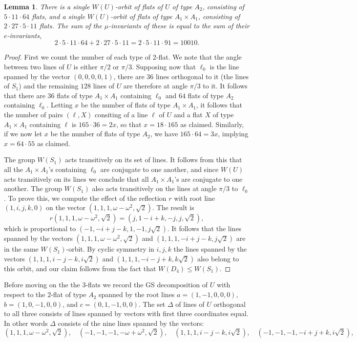 \documentclass[11pt, reqno]{amsart}
\numberwithin{equation}{section}
\theoremstyle{definition}
\theoremstyle{plain}
\newtheorem{lemma}[theorem]{Lemma}
\begin{document}
\begin{lemma}
There is a single $W(U)$-orbit of flats of $U$ of type $A_2$, consisting of $5 \cdot 11 \cdot 64$ flats, and a single $W(U)$-orbit of flats of type $A_1 \times A_1$, consisting of $2 \cdot 27 \cdot 5 \cdot 11$ flats. The sum of the $\mu$-invariants of these is equal to the sum of their $e$-invariants, $$2 \cdot 5 \cdot 11 \cdot 64+2 \cdot 27 \cdot 5 \cdot 11=2 \cdot 5 \cdot 11 \cdot 91=10010.$$
\end{lemma}
\begin{proof}
First we count the number of each type of $2$-flat. We note that the angle between two lines of $U$ is either $\pi /2$ or $\pi /3$. Supposing now that $\ell_0$ is the line spanned by the vector $(0,0,0,0,1)$, there are $36$ lines orthogonal to it (the lines of $S_1$) and the remaining $128$ lines of $U$ are therefore at angle $\pi /3$ to it. It follows that there are $36$ flats of type $A_1 \times A_1$ containing $\ell_0$ and $64$ flats of type $A_2$ containing $\ell_0$. Letting $x$ be the number of flats of type $A_1 \times A_1$, it follows that the number of pairs $(\ell,X)$ consiting of a line $\ell$ of $U$ and a flat $X$ of type $A_1 \times A_1$ containing $\ell$ is $165 \cdot 36 = 2x$, so that $x=18 \cdot 165$ as claimed. Similarly, if we now let $x$ be the number of flats of type $A_2$, we have $165 \cdot 64=3x$, implying $x=64 \cdot 55$ as claimed.

The group $W(S_1)$ acts transitively on its set of lines. It follows from this that all the $A_1 \times A_1$'s containing $\ell_0$ are conjugate to one another, and since $W(U)$ acts transitively on its lines we conclude that all $A_1 \times A_1$'s are conjugate to one another. The group $W(S_1)$ also acts transitively on the lines at angle $\pi/3$ to $\ell_0$. To prove this, we compute the effect of the reflection $r$ with root line $(1,i,j,k,0)$ on the vector $(1,1,1,\omega-\omega^2,\sqrt{2})$. The result is
$$r(1,1,1,\omega-\omega^2,\sqrt{2})=(j,1-i+k,-j,j,\sqrt{2}),$$ which is proportional to $(-1,-i+j-k,1,-1,j\sqrt{2})$. It follows that the lines spanned by the vectors $(1,1,1,\omega-\omega^2,\sqrt{2})$ and $(1,1,1,-i+j-k,j\sqrt{2})$ are in the same $W(S_1)$-orbit. By cyclic symmetry in $i,j,k$ the lines spanned by the vectors $(1,1,1,i-j-k,i\sqrt{2})$ and $(1,1,1,-i-j+k,k\sqrt{2})$ also belong to this orbit, and our claim follows from the fact that $W(D_4) \leq W(S_1)$.
\end{proof}

Before moving on the the $3$-flats we record the GS decomposition of $U$ with respect to the $2$-flat of type $A_2$ spanned by the root lines $a=(1,-1,0,0,0)$, $b=(1,0,-1,0,0)$, and $c=(0,1,-1,0,0)$. The set $\Delta$ of lines of $U$ orthogonal to all three consists of lines spanned by vectors with first three coordinates equal. In other words $\Delta$ consists of the nine lines spanned by the vectors:
$$(1,1,1,\omega-\omega^2,\sqrt{2}), \quad (-1,-1,-1,-\omega+\omega^2,\sqrt{2}), \quad (1,1,1,i-j-k,i \sqrt{2}), \quad (-1,-1,-1,-i+j+k,i \sqrt{2}), $$
\end{document}
